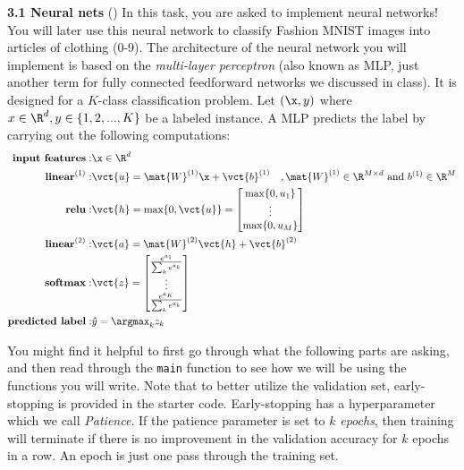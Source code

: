 \textbf{3.1 Neural nets} ()
In this task, you are asked to implement neural networks! You will later use this neural network to classify Fashion MNIST images into articles of clothing (0-9). The architecture of the neural network you will implement is based on the \emph{multi-layer perceptron} (also known as {MLP}, just another term for fully connected feedforward networks we discussed in class). It is designed for a $K$-class classification problem. Let $(\x,y)$ where $x\in\R^d, y\in\{1,2,...,K\}$  be a labeled instance. A MLP predicts the label by carrying out the following computations:
\begin{align*}
    \textbf{input features}: & \x\in\R^d \\
    \textbf{linear}^{(1)}: & \vct{u}=\mat{W}^{(1)}\x+\vct{b}^{(1)} \quad , \mat{W}^{(1)}\in\R^{M\times d} \ \text{and} \ b^{(1)}\in\R^M \\
    \textbf{relu}: & \vct{h} = \max\{0, \vct{u}\}=
    \begin{bmatrix} 
        \max\{0, u_1\} \\
        \vdots \\
        \max\{0, u_M\}
    \end{bmatrix} \\
    \textbf{linear}^{(2)}: & \vct{a}=\mat{W}^{(2)}\vct{h}+\vct{b}^{(2)} \\
    \textbf{softmax}: & \vct{z} = 
    \begin{bmatrix} 
        \frac{e^{a_1}}{\sum_k e^{a_k}} \\
        \vdots \\
        \frac{e^{a_K}}{\sum_k e^{a_k}} \\
    \end{bmatrix} \\
    \textbf{predicted label}: & \hat{y}=\argmax_k z_k
\end{align*}

You might find it helpful to first go through what the following parts are asking, and then read through the \texttt{main} function to see how we will be using the functions you will write. Note that to better utilize the validation set, early-stopping is provided in the starter code. Early-stopping has a hyperparameter which we call \textit{Patience}. If the patience parameter is set to $k$ \emph{epochs}, then training will terminate if there is no improvement in the validation accuracy for $k$ epochs in a row. An epoch is just one pass through the training set.  \\

